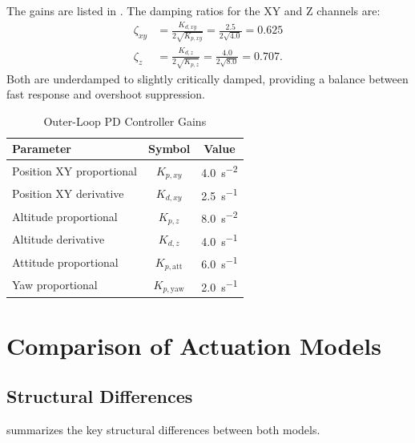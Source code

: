 \documentclass[journal]{IEEEtran}
\begin{document}
The gains are listed in . The damping ratios for the XY and Z channels are:
\begin{align}
  \zeta_{xy} &= \frac{K_{d,xy}}{2\sqrt{K_{p,xy}}} = \frac{2.5}{2\sqrt{4.0}} = 0.625 \label{eq:zeta_xy} \\
  \zeta_z    &= \frac{K_{d,z}}{2\sqrt{K_{p,z}}}    = \frac{4.0}{2\sqrt{8.0}} = 0.707. \label{eq:zeta_z}
\end{align}
Both are underdamped to slightly critically damped, providing a balance between fast response and overshoot suppression.

\begin{table}[!t]
  \centering
  \caption{Outer-Loop PD Controller Gains}
  \label{tab:pd_gains}
  \begin{tabular}{@{}lcc@{}}
    \toprule
    Parameter & Symbol & Value \\
    \midrule
    Position XY proportional & $K_{p,xy}$ & \SI{4.0}{s^{-2}} \\
    Position XY derivative & $K_{d,xy}$ & \SI{2.5}{s^{-1}} \\
    Altitude proportional & $K_{p,z}$ & \SI{8.0}{s^{-2}} \\
    Altitude derivative & $K_{d,z}$ & \SI{4.0}{s^{-1}} \\
    Attitude proportional & $K_{p,\text{att}}$ & \SI{6.0}{s^{-1}} \\
    Yaw proportional & $K_{p,\text{yaw}}$ & \SI{2.0}{s^{-1}} \\
    \bottomrule
  \end{tabular}
\end{table}


\section{Comparison of Actuation Models}
\label{sec:comparison}

\subsection{Structural Differences}

 summarizes the key structural differences between both models.
\end{document}
